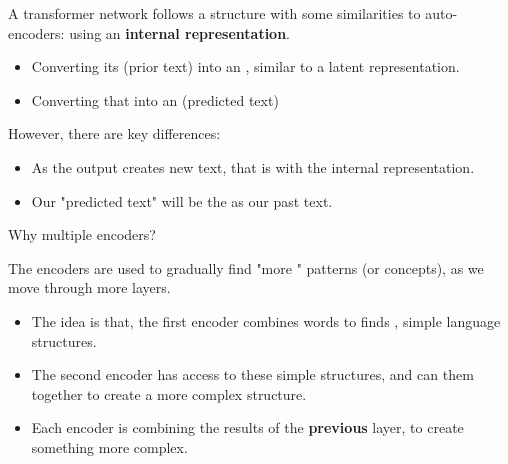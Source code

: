         \begin{concept}
            A transformer network follows a structure with some similarities to auto-encoders: using an \textbf{internal representation}.
            
            \begin{itemize}
                \item Converting its  (prior text) into an , similar to a latent representation.
                \item Converting that  into an  (predicted text)
            \end{itemize}

            However, there are key differences:
            \begin{itemize}
                \item As the output creates new text, that is  with the internal representation.

                \item Our "predicted text" will  be the  as our past text.
            \end{itemize}
        \end{concept}

        Why multiple encoders?\\

        \begin{concept}
            The  encoders are used to gradually find "more " patterns (or concepts), as we move through more layers.

            \subsecdiv

            \begin{itemize}
                \item The idea is that, the first encoder combines words to finds , simple language structures. 
                \item The second encoder has access to these simple structures, and can  them together to create a more complex structure.
                \item Each encoder is combining the results of the \textbf{previous} layer, to create something more complex.
            \end{itemize}

            
        \end{concept}

